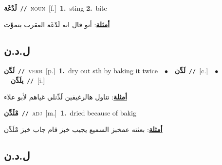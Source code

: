 \documentclass[10pt,a4paper,twoside]{article} %
\begin{document}
\begin{multicols}{2}
{\setlength\topsep{0pt}\textbf{\foreignlanguage{arabic}{لَدْغَة}}\ {\color{gray}\texttt{//}\color{black}}\ \textsc{noun}\ [f.]\ \textbf{1.}~sting  \textbf{2.}~bite\  \begin{flushright}\color{gray}\foreignlanguage{arabic}{\textbf{\underline{\foreignlanguage{arabic}{أمثلة}}}: أنو قال انه لَدْغَة العقرب بتموِّت}\end{flushright}\color{black}} \vspace{2mm}

\vspace{-3mm}
\subsection*{\color{blue}\foreignlanguage{arabic}{ل.د.ن}\color{blue}{}} 

{\setlength\topsep{0pt}\textbf{\foreignlanguage{arabic}{لَدَّن}}\ {\color{gray}\texttt{//}\color{black}}\ \textsc{verb}\ [p.]\ \textbf{1.}~dry out sth by baking it twice\ \ $\bullet$\ \ \setlength\topsep{0pt}\textbf{\foreignlanguage{arabic}{لَدِّن}}\ {\color{gray}\texttt{//}\color{black}}\ [c.]\ \ $\bullet$\ \ \setlength\topsep{0pt}\textbf{\foreignlanguage{arabic}{يلَدِّن}}\ {\color{gray}\texttt{//}\color{black}}\ [i.]\  \begin{flushright}\color{gray}\foreignlanguage{arabic}{\textbf{\underline{\foreignlanguage{arabic}{أمثلة}}}: تناول هالرغيفين لَدِّنلي غياهم لأبو علاء}\end{flushright}\color{black}} \vspace{2mm}

{\setlength\topsep{0pt}\textbf{\foreignlanguage{arabic}{مْلَدِّن}}\ {\color{gray}\texttt{//}\color{black}}\ \textsc{adj}\ [m.]\ \textbf{1.}~dried because of bakig\  \begin{flushright}\color{gray}\foreignlanguage{arabic}{\textbf{\underline{\foreignlanguage{arabic}{أمثلة}}}: بعثته عمخبز السميع يجيب خبز قام جاب خبز مْلَدِّن}\end{flushright}\color{black}} \vspace{2mm}

\vspace{-3mm}
\subsection*{\color{blue}\foreignlanguage{arabic}{ل.د.ن}\color{blue}{ (ntws)}} 


\end{multicols}
\end{document}
